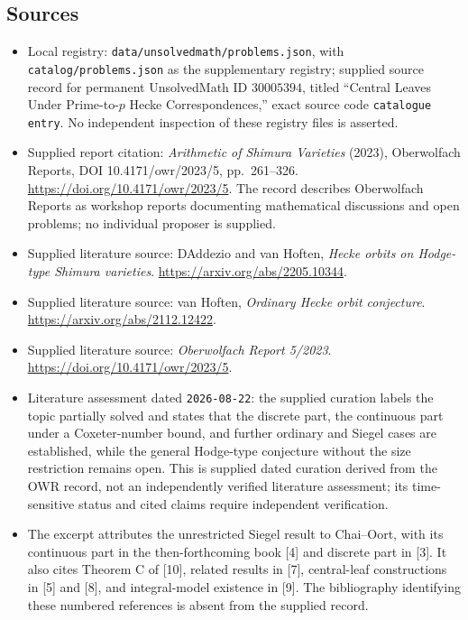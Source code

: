 \documentclass[11pt]{article}
\begin{document}
\subsection{Sources}
\begin{itemize}
\item Local registry: \texttt{data/unsolvedmath/problems.json}, with \texttt{catalog/problems.json} as the supplementary registry; supplied source record for permanent UnsolvedMath ID \(30005394\), titled ``Central Leaves Under Prime-to-\(p\) Hecke Correspondences,'' exact source code \texttt{catalogue entry}. No independent inspection of these registry files is asserted.
\item Supplied report citation: \emph{Arithmetic of Shimura Varieties} (2023), Oberwolfach Reports, DOI 10.4171/owr/2023/5, pp.\ 261--326. \url{https://doi.org/10.4171/owr/2023/5}. The record describes Oberwolfach Reports as workshop reports documenting mathematical discussions and open problems; no individual proposer is supplied.
\item Supplied literature source: DAddezio and van Hoften, \emph{Hecke orbits on Hodge-type Shimura varieties}. \url{https://arxiv.org/abs/2205.10344}.
\item Supplied literature source: van Hoften, \emph{Ordinary Hecke orbit conjecture}. \url{https://arxiv.org/abs/2112.12422}.
\item Supplied literature source: \emph{Oberwolfach Report 5/2023}. \url{https://doi.org/10.4171/owr/2023/5}.
\item Literature assessment dated \texttt{2026-08-22}: the supplied curation labels the topic partially solved and states that the discrete part, the continuous part under a Coxeter-number bound, and further ordinary and Siegel cases are established, while the general Hodge-type conjecture without the size restriction remains open. This is supplied dated curation derived from the OWR record, not an independently verified literature assessment; its time-sensitive status and cited claims require independent verification.
\item The excerpt attributes the unrestricted Siegel result to Chai--Oort, with its continuous part in the then-forthcoming book [4] and discrete part in [3]. It also cites Theorem C of [10], related results in [7], central-leaf constructions in [5] and [8], and integral-model existence in [9]. The bibliography identifying these numbered references is absent from the supplied record.
\end{itemize}
\end{document}
